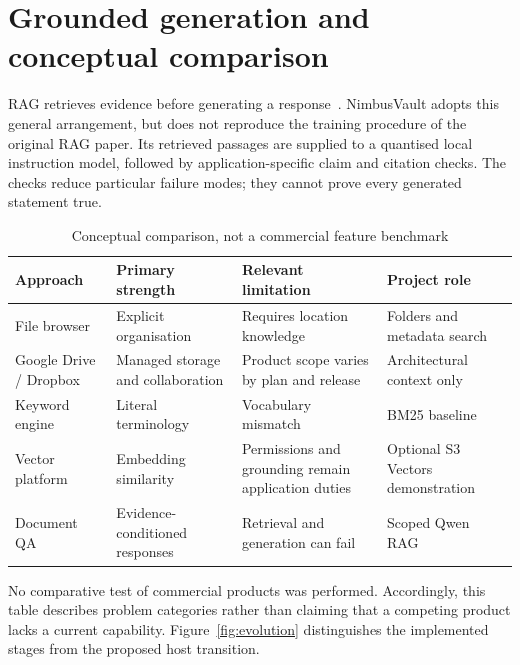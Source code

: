 \section{Grounded generation and conceptual comparison}
RAG retrieves evidence before generating a response~\cite{ragpaper}. NimbusVault adopts this general arrangement, but does not reproduce the training procedure of the original RAG paper. Its retrieved passages are supplied to a quantised local instruction model, followed by application-specific claim and citation checks. The checks reduce particular failure modes; they cannot prove every generated statement true.
\par\begin{table}[htbp]\caption{Conceptual comparison, not a commercial feature benchmark}\small\begin{tabularx}{\linewidth}{p{.25\linewidth}YYY}\toprule Approach&Primary strength&Relevant limitation&Project role\\\midrule
File browser&Explicit organisation&Requires location knowledge&Folders and metadata search\\
Google Drive / Dropbox&Managed storage and collaboration&Product scope varies by plan and release&Architectural context only\\
Keyword engine&Literal terminology&Vocabulary mismatch&BM25 baseline\\
Vector platform&Embedding similarity&Permissions and grounding remain application duties&Optional S3 Vectors demonstration\\
Document QA&Evidence-conditioned responses&Retrieval and generation can fail&Scoped Qwen RAG\\\bottomrule\end{tabularx}\end{table}\par
No comparative test of commercial products was performed. Accordingly, this table describes problem categories rather than claiming that a competing product lacks a current capability.
Figure~\ref{fig:evolution} distinguishes the implemented stages from the proposed host transition.
\FloatBarrier

